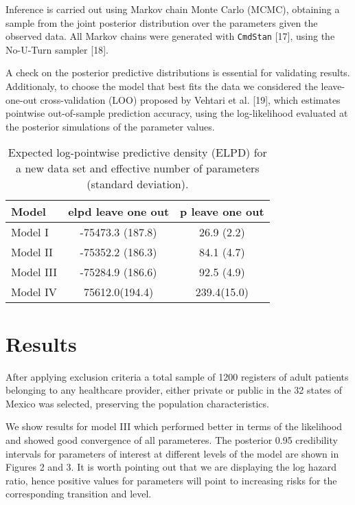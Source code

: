 \documentclass[10pt,letterpaper]{article}
\begin{document}
Inference is carried out using Markov chain Monte Carlo (MCMC),
obtaining a sample from the joint posterior distribution over the
parameters given the observed data. All Markov chains were generated
with \texttt{CmdStan} {[}17{]}, using the No-U-Turn sampler {[}18{]}.

A check on the posterior predictive distributions is essential for
validating results. Additionaly, to choose the model that best fits the
data we considered the leave-one-out cross-validation (LOO) proposed by
Vehtari et al. {[}19{]}, which estimates pointwise out-of-sample
prediction accuracy, using the log-likelihood evaluated at the posterior
simulations of the parameter values.

\begin{table}[!htb]
\centering
\begin{tabular}{lcc}
\hline
{\textbf{Model}} & {\textbf{elpd leave one out}} & {\textbf{p leave one out}} \\
\hline Model I  &  -75473.3 (187.8) & 26.9 (2.2) \\
Model II          &   -75352.2 (186.3) &  84.1 (4.7)\\
Model III         &    -75284.9 (186.6) &  92.5 (4.9)  \\
Model IV & 75612.0(194.4) & 239.4(15.0) \\
\hline
\end{tabular}
\caption{\label{tab:gof} Expected log-pointwise predictive density (ELPD) for a new data set and effective number of parameters (standard deviation).}
\end{table}

\hypertarget{results}{%
\section{Results}\label{results}}

After applying exclusion criteria a total sample of 1200 registers of
adult patients belonging to any healthcare provider, either private or
public in the 32 states of Mexico was selected, preserving the
population characteristics.

We show results for model III which performed better in terms of the
likelihood and showed good convergence of all parameteres. The posterior
0.95 credibility intervals for parameters of interest at different
levels of the model are shown in Figures 2 and 3. It is worth pointing
out that we are displaying the log hazard ratio, hence positive values
for parameters will point to increasing risks for the corresponding
transition and level.
\end{document}
